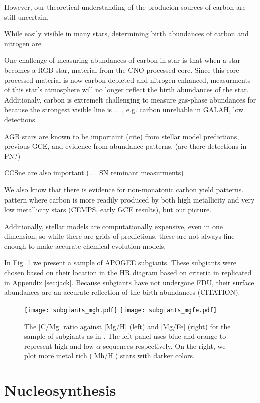 \documentclass[12pt,oneside]{report}
\begin{document}
However, our theoretical understanding of the producion sources of carbon are still uncertain.

While easily visible in many stars, determining birth abundances of carbon and nitrogen are 

One challenge of measuring abundances of carbon in star is that when a star becomes a RGB star, material from the CNO-processed core. Since this core-processed material is now carbon depleted and nitrogen enhanced, measurments of this star's atmosphere will no longer reflect the birth abundances of the star.
Additionaly, carbon is extremelt challenging to measure gas-phase abundances for because the strongest visible line is ...., e.g. carbon unreliable in GALAH, low detections.

AGB stars are known to be importaint (cite) from stellar model predictions, previous GCE, and evidence from abundance patterns. (are there detections in PN?)

CCSne are also important (.... SN reminant measurments)

We also know that there is evidence for non-monatonic carbon yield patterns. 
pattern where carbon is more readily produced by both high metallicity and very low metallicity stars (CEMPS, early GCE results), but our picture.

Additionally, stellar models are computationally expensive, even in one dimension, so while there are grids of predictions, these are not always fine enough to make accurate chemical evolution models. 


In Fig. \ref{fig:subgiants} we present a sample of APOGEE subgiants. These subgiants were chosen based on their location in the HR diagram based on criteria in \citet{jack_subgiant} replicated in Appendix \ref{sec:jack}. Because subgiants have not undergone FDU, their surface abundances are an accurate reflection of the birth abundances (CITATION).  




\begin{figure}[htp]
    \texttt{[image: subgiants\_mgh.pdf]}
    \texttt{[image: subgiants\_mgfe.pdf]}
    \caption[APOGEE Subgiants]{The [C/Mg] ratio against [Mg/H] (left) and [Mg/Fe] (right) for the sample of subgiants as in \cite{jack_subgiant}. The left panel uses blue and orange to represent high and low $\alpha$ sequences respectively. On the right, we plot more metal rich ([Mh/H]) stars with darker colors.}
    \label{fig:subgiants}
\end{figure}
\chapter{Nucleosynthesis}
\end{document}
